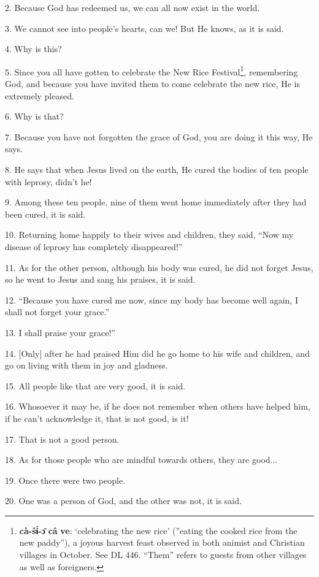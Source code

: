 2. Because God has redeemed us, we can all now exist in the world.

3. We cannot see into people's hearts, can we! But He knows, as it is said.

4. Why is this?

5. Since you all have gotten to celebrate the New Rice Festival\footnote{\textbf{cà-šɨ́-ɔ̄} \textbf{câ} \textbf{ve}: `celebrating the new rice' (''eating the cooked rice from the new paddy''), a joyous harvest feast observed in both animist and Christian villages in October. See DL 446. ``Them'' refers to guests from other villages as well as foreigners.}, remembering
God, and because you have invited them to come celebrate the new rice, He is
extremely pleased.

6. Why is that?

7. Because you have not forgotten the grace of God, you are doing it this way,
He says.

8. He says that when Jesus lived on the earth, He cured the bodies of ten people
with leprosy, didn't he!

9. Among these ten people, nine of them went home immediately after they had been
cured, it is said.

10. Returning home happily to their wives and children, they said, ``Now my disease
of leprosy has completely disappeared!''

11. As for the other person, although his body was cured, he did not forget Jesus,
so he went to Jesus and sang his praises, it is said.

12. ``Because you have cured me now, since my body has become well again, I shall
not forget your grace.''

13. I shall praise your grace!''

14. [Only] after he had praised Him did he go home to his wife and children, and
go on living with them in joy and gladness.

15. All people like that are very good, it is said.

16. Whosoever it may be, if he does not remember when others have helped him, if
he can't acknowledge it, that is not good, is it!

17. That is not a good person.

18. As for those people who are mindful towards others, they are good...

19. Once there were two people.

20. One was a person of God, and the other was not, it is said.

